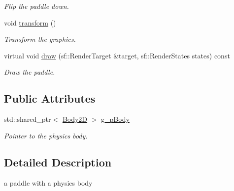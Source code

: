 \begin{DoxyCompactItemize}
\begin{DoxyCompactList}\small\item\em Flip the paddle down. \end{DoxyCompactList}\item 
\hypertarget{class_paddle_a4e9ab8e3c5d087a8d23beed16f38dd00}{void \hyperlink{class_paddle_a4e9ab8e3c5d087a8d23beed16f38dd00}{transform} ()}\label{class_paddle_a4e9ab8e3c5d087a8d23beed16f38dd00}

\begin{DoxyCompactList}\small\item\em Transform the graphics. \end{DoxyCompactList}\item 
virtual void \hyperlink{class_paddle_a569a4a016b265cb3af3012061adafdea}{draw} (sf\+::\+Render\+Target \&target, sf\+::\+Render\+States states) const 
\begin{DoxyCompactList}\small\item\em Draw the paddle. \end{DoxyCompactList}\end{DoxyCompactItemize}
\subsection*{Public Attributes}
\begin{DoxyCompactItemize}
\item 
\hypertarget{class_paddle_aa1010d0654e87e6616bdc246f04d3ad6}{std\+::shared\+\_\+ptr$<$ \hyperlink{class_body2_d}{Body2\+D} $>$ \hyperlink{class_paddle_aa1010d0654e87e6616bdc246f04d3ad6}{g\+\_\+p\+Body}}\label{class_paddle_aa1010d0654e87e6616bdc246f04d3ad6}

\begin{DoxyCompactList}\small\item\em Pointer to the physics body. \end{DoxyCompactList}\end{DoxyCompactItemize}


\subsection{Detailed Description}
a paddle with a physics body 

